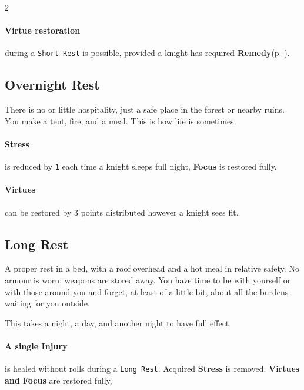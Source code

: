 \begin{multicols*}{2}
\paragraph{Virtue restoration} during a \texttt{Short Rest} is possible, provided a knight has required \textbf{Remedy}(p. \pageref*{sec:gear}).

\newcolumn

\subsection*{Overnight Rest}

There is no or little hospitality, just a safe place in the forest or nearby ruins. You make a tent, fire, and a meal.
This is how life is sometimes.

\paragraph{Stress} is reduced by \texttt{1} each time a knight sleeps full night, \textbf{Focus} is restored fully.

\paragraph{Virtues} can be restored by 3 points distributed however a knight sees fit.

\subsection*{Long Rest}

A proper rest in a bed, with a roof overhead and a hot meal in relative safety.
No armour is worn; weapons are stored away.
You have time to be with yourself or with those around you and forget, at least of a little bit, about all the burdens waiting for you outside.

This takes a night, a day, and another night to have full effect.

\paragraph{A single Injury} is healed without rolls during a \texttt{Long Rest}. 
Acquired \textbf{Stress} is removed. 
\textbf{Virtues and Focus} are restored fully, 

\end{multicols*}
